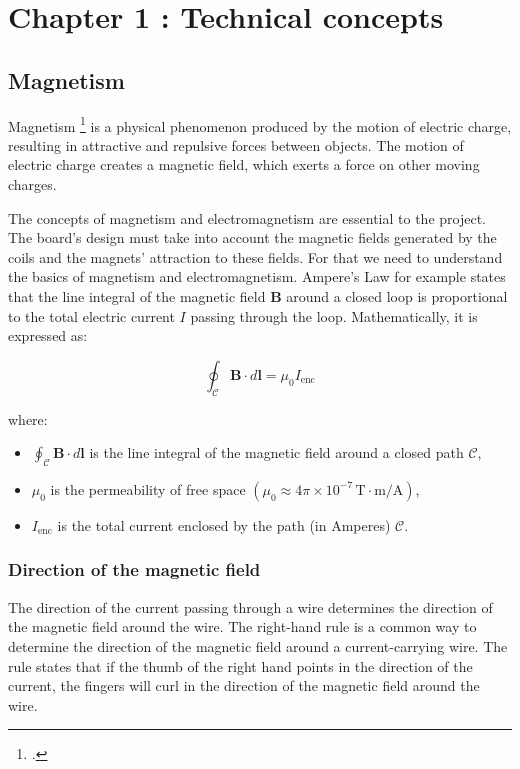 
\chapter{Chapter 1 :  Technical concepts}


\section{Magnetism}

Magnetism \footcite{noauthor_nasa_magnetism} is a physical phenomenon produced by the motion of electric charge, resulting in attractive and repulsive forces between objects. The motion of electric charge creates a magnetic field, which exerts a force on other moving charges.

The concepts of magnetism and electromagnetism are essential to the project. The board's design must take into account the magnetic fields generated by the coils and the magnets' attraction to these fields. For that we need to understand the basics of magnetism and electromagnetism. Ampere's Law for example states that the line integral of the magnetic field \(\mathbf{B}\) around a closed loop is proportional to the total electric current \(I\) passing through the loop. Mathematically, it is expressed as:

\[
	\oint_{\mathcal{C}} \mathbf{B} \cdot d\mathbf{l} = \mu_0 I_{\text{enc}}
\]

where:
\begin{itemize}
	\item \(\oint_{\mathcal{C}} \mathbf{B} \cdot d\mathbf{l}\) is the line integral of the magnetic field around a closed path \(\mathcal{C}\),
	\item \(\mu_0\) is the permeability of free space \((\mu_0 \approx 4\pi \times 10^{-7} \, \text{T} \cdot \text{m/A})\),
	\item \(I_{\text{enc}}\) is the total current enclosed by the path (in Amperes) \(\mathcal{C}\).
\end{itemize}

\newpage

\subsection{Direction of the magnetic field}
The direction of the current passing through a wire determines the direction of the magnetic field around the wire. The right-hand rule is a common way to determine the direction of the magnetic field around a current-carrying wire. The rule states that if the thumb of the right hand points in the direction of the current, the fingers will curl in the direction of the magnetic field around the wire.

